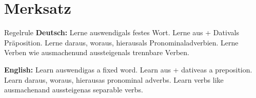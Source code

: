 \documentclass[a4paper,11pt]{article}
\newcommand{\GermanText}[1]{\textbf{Deutsch: }#1\par}
\newcommand{\EnglishText}[1]{{\small\color{SoftGray}\textbf{English: }#1\par}}
\begin{document}
\section{Merksatz}

\begin{grammarentry}{Regel}{rule}
\GermanText{Lerne \glqq auswendig\grqq als festes Wort. Lerne \glqq aus + Dativ\grqq als Präposition. Lerne \glqq daraus, woraus, hieraus\grqq als Pronominaladverbien. Lerne Verben wie \glqq ausmachen\grqq und \glqq aussteigen\grqq als trennbare Verben.}
\EnglishText{Learn \glqq auswendig\grqq as a fixed word. Learn \glqq aus + dative\grqq as a preposition. Learn \glqq daraus, woraus, hieraus\grqq as pronominal adverbs. Learn verbs like \glqq ausmachen\grqq and \glqq aussteigen\grqq as separable verbs.}
\end{grammarentry}
\end{document}
